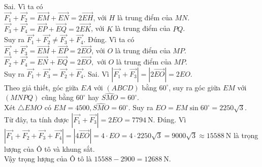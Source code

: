 \begin{ex}
{\begin{itemchoice}
			\itemch Sai. Vì ta có\\
			$\overrightarrow{F_1}+\overrightarrow{F_2}=\overrightarrow{E M}+\overrightarrow{EN}=2 \overrightarrow{EH}$, với $H$ là trung điểm của $MN$.\\
			$\overrightarrow{F_3}+\overrightarrow{F_4}=\overrightarrow{EP}+\overrightarrow{EQ}=2\overrightarrow{EK}$, với $K$ là trung điểm của $PQ$.\\
			Suy ra $\overrightarrow{F_1}+\overrightarrow{F_2} \neq \overrightarrow{F_3}+\overrightarrow{F_4}$.
			\itemch Đúng. Vì ta có\\
			$\overrightarrow{F_1}+\overrightarrow{F_3}=\overrightarrow{E M}+\overrightarrow{E P}=2 \overrightarrow{E O}$, với $O$ là trung điểm của $MP$.\\
			$\overrightarrow{F_2}+\overrightarrow{{{F}_{4}}}=\overrightarrow{EN}+\overrightarrow{EQ}=2\overrightarrow{EO},$ với $O$ là trung điểm của $MP$.\\
			Suy ra $\overrightarrow{F_1}+\overrightarrow{F_3}=\overrightarrow{F_2}+\overrightarrow{F_4}$.
			\itemch Sai. Vì $\left|\overrightarrow{F_1}+\overrightarrow{F_3}\right|=\left|2 \overrightarrow{EO}\right|=2EO$.\\
			Theo giả thiết, góc giữa $EA$ với $(ABCD)$ bằng $60^{\circ}$, suy ra góc giữa $EM$ với $(M N P Q)$ cũng bằng $60^{\circ}$ hay $\widehat{SMO}=60^{\circ}$.\\
			Xét $\triangle EMO$ có $EM=4500,\widehat{SMO}=60^{\circ}$. Suy ra $EO=EM\sin 60^{\circ}=2250\sqrt{3}$.\\
			Từ đây, ta tính được $\left| \overrightarrow{F_1}+\overrightarrow{F_3} \right|=2EO=7794~\text{N}$.
			\itemch Đúng. Vì $\left| \overrightarrow{F_1}+\overrightarrow{F_2}+\overrightarrow{F_3}+\overrightarrow{F_4} \right|=\left|4\overrightarrow{EO}\right|=4 \cdot EO=4 \cdot 2250\sqrt{3}=9000\sqrt{3}\approx 15588~\text{N}$ là trọng lượng của Ô tô và khung sắt.\\
			Vậy trọng lượng của Ô tô là $15588-2900=12688~\text{N}$.
		\end{itemchoice}
	}
\end{ex}

